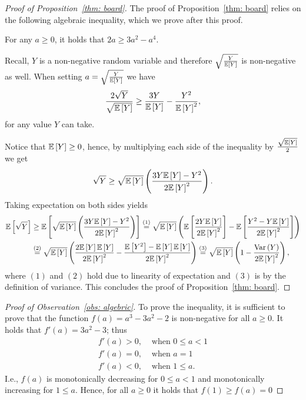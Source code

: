 \begin{proof}[Proof of Proposition~\ref{thm: board}]
    The proof of Proposition~\ref{thm: board} relies on the following algebraic inequality, which we prove after this proof.
    \begin{observation}\label{obs: algebric}
        For any $a\geq 0$, it holds that $2a \geq 3a^2 - a^4$.
    \end{observation}
    
    Recall, $Y$ is a non-negative random variable and therefore $\sqrt{\frac{Y}{\mathbb{E}\left[ Y \right]}}$ is non-negative as well.
    When setting $a=\sqrt{\frac{Y}{\mathbb{E}\left[ Y \right]}}$ we have
    \begin{align*}
         \frac{2\sqrt{Y}}{\sqrt{\mathbb{E}\left[ Y \right]}} \geq \frac{3Y}{\mathbb{E}\left[ Y \right]} - \frac{Y^2}{\mathbb{E}\left[ Y \right]^2},
    \end{align*}
    for any value $Y$ can take.
    
    Notice that $\mathbb{E}\left[ Y \right]\geq 0$, hence, by multiplying each side of the inequality by $\frac{\sqrt{\mathbb{E}\left[ Y \right]}}{2}$ we get
    \begin{align*}
        \sqrt{Y} \geq \sqrt{\mathbb{E}\left[ Y \right]}\left(\frac{3Y\mathbb{E}\left[ Y \right] - Y^2}{2\mathbb{E}\left[ Y \right]^2}\right).
    \end{align*}
    Taking expectation on both sides yields
    \begin{align*}
        \mathbb{E}\left[ \sqrt{Y} \right] & \geq
        \mathbb{E}\left[ \sqrt{\mathbb{E}\left[ Y \right]}\left(\frac{3Y\mathbb{E}\left[ Y \right] - Y^2}{2\mathbb{E}\left[ Y \right]^2}\right) \right] \overset{(1)}{=}
        \sqrt{\mathbb{E}\left[ Y \right]}\left(\mathbb{E}\left[ \frac{2Y\mathbb{E}\left[ Y \right]}{2\mathbb{E}\left[ Y \right]^2} \right] - \mathbb{E}\left[ \frac{Y^2 - Y\mathbb{E}\left[ Y \right]}{2\mathbb{E}\left[ Y \right]^2} \right]\right)
        \\&\overset{(2)}{=}
        \sqrt{\mathbb{E}\left[ Y \right]}\left(\frac{2\mathbb{E}\left[ Y \right]\mathbb{E}\left[ Y \right]}{2\mathbb{E}\left[ Y \right]^2} - \frac{\mathbb{E}\left[ Y^2 \right] - \mathbb{E}\left[ Y \right]\mathbb{E}\left[ Y \right]}{2\mathbb{E}\left[ Y \right]^2}\right) \overset{(3)}{=}
        \sqrt{\mathbb{E}\left[ Y \right]}\left(1 - \frac{\mathrm{Var}\left( Y \right)}{2\mathbb{E}\left[ Y \right]^2}   \right) ,
    \end{align*}
    where $(1)$ and $(2)$ hold due to linearity of expectation and $(3)$ is by the definition of variance. This concludes the proof of Proposition~\ref{thm: board}.
\end{proof}

\begin{proof}[Proof of Observation~\ref{obs: algebric}]
    To prove the inequality, it is sufficient to prove that the function $f(a) = a^3 - 3a^2 -2$ is non-negative for all $a\geq 0$.
    It holds that $f'(a) = 3 a^2 - 3$; thus
    \begin{align*}
        f'(a) > 0, & \text{ when } 0 \leq a < 1 \\
        f'(a) = 0, & \text{ when } a = 1 \\
        f'(a) < 0, & \text{ when } 1 \leq a.
    \end{align*}
    I.e., $f(a)$ is monotonically decreasing for $0\leq a <1$ and monotonically increasing for $1 \leq a$. 
    Hence, for all $a \geq 0$ it holds that $f(1) \geq f(a) = 0$
\end{proof}

